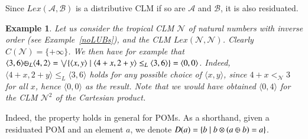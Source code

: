 \documentclass[a4paper]{elsarticle}
\newtheorem{example}{Example}
\newcommand{\1}{\mathbf{1}}
\def\odiv{{ \ominus\hspace{-8pt}:}\;}
\begin{document}
Since $Lex(\mathcal{A},\mathcal{B})$ is a distributive CLM if so are $\mathcal{A}$ and $\mathcal{B}$, it is also residuated.

\begin{example}
	Let us consider the tropical CLM $\mathcal{N}$ of natural numbers with inverse order 
	(see Example~\ref{noLUBs}),
	and the CLM $Lex(\mathcal{N},\mathcal{N})$. Clearly $C(\mathcal{N}) = \{+\infty\}$. We then have for example
	that
	$\langle 3, 6 \rangle \odiv_L \langle 4, 2 \rangle = \bigvee \{\langle x, y \rangle \mid \langle 4 + x, 2 + y \rangle \leq_L \langle 3, 6 \rangle\} = \langle 0,0 \rangle$.
	Indeed, $\langle 4 + x, 2 + y \rangle \leq_L \langle 3, 6 \rangle$ holds for any possible choice of $\langle x, y \rangle$,
	since $4 + x <_\mathcal{N} 3$ for all $x$, hence $\langle 0,0 \rangle$ as the result.
	Note that we would have obtained $\langle 0, 4 \rangle$ for the CLM $\mathcal{N}^2$ of the Cartesian product.
\end{example}

Indeed, the property holds in general for POMs. As a shorthand, given a residuated POM 
and an element $a$, we denote $D(a) = \{ b \mid b \otimes (a \mathbin{\odiv} b) = a\}$.
\end{document}

